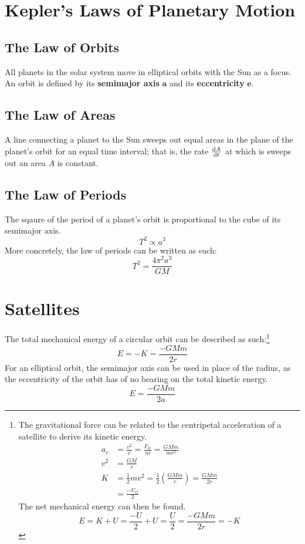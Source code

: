 \documentclass[../AP_Physics_C]{subfiles}
\begin{document}
	\section{Kepler's Laws of Planetary Motion}
		\subsection{The Law of Orbits}
			All planets in the solar system move in elliptical orbits with the Sun as a focus. \\
			An orbit is defined by its \textbf{semimajor axis} $\bm{a}$ and its \textbf{eccentricity} $\bm{e}$.
		\subsection{The Law of Areas}
			A line connecting a planet to the Sun sweeps out equal areas in the plane of the planet's orbit for an equal time interval; that is, the rate $\frac{\mathrm{d} A}{\mathrm{d} t}$ at which is sweeps out an area $A$ is constant.
		\subsection{The Law of Periods}
			The sqaure of the period of a planet's orbit is proportional to the cube of its semimajor axis.
			\[T^2 \propto a^3\]
			More concretely, the law of periods can be written as such:
			\[T^2 =\frac{4\pi^2a^3}{GM}\]
	\section{Satellites}
		The total mechanical energy of a circular orbit can be described as such:\footnote{
			The gravitational force can be related to the centripetal acceleration of a satellite to derive its kinetic energy.
			\begin{align*}
				a_c &= \frac{v^2}{r} = \frac{F_G}{m} = \frac{GMm}{mr^2} \\
				v^2 &= \frac{GM}{r} \\
				K &= \frac{1}{2}mv^2 = \frac{1}{2}\left(\frac{GMm}{r}\right) = \frac{GMm}{2r} \\
					&= \frac{-U_G}{2}
			\end{align*}
			The net mechanical energy can then be found.
			\[E = K + U = \frac{-U}{2} + U = \frac{U}{2} = \frac{-GMm}{2r} = -K\]
		}
		\[E = -K = \frac{-GMm}{2r}\]
		For an elliptical orbit, the semimajor axis can be used in place of the radius, as the eccentricity of the orbit has of no bearing on the total kinetic energy.
		\[E = \frac{-GMm}{2a}\]
\end{document}
